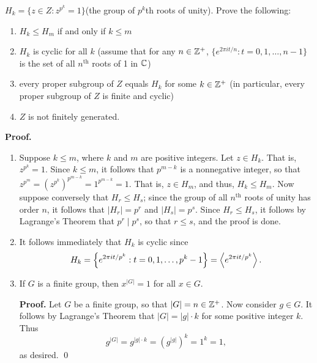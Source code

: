 \begin{enumerate}
                  $H_k = \{z \in Z : z^{p^k} = 1\}$(the group of $p^k$th roots
                  of unity). Prove the following:
                  \begin{enumerate}
                     \item $H_k \le H_m$ if and only if $k \le m$
                     \item $H_k$ is cyclic for all $k$ (assume that for any
                           $n \in \mathbb{Z}^+$, $\{e^{2\pi it/n}:t =0,1,\ldots, n-1\}$
                           is the set of all $n^{\text{th}}$ roots of 1 in
                           $\mathbb{C}$)
                     \item every proper subgroup of $Z$ equals $H_k$ for some
                           $k \in \mathbb{Z}^+$ (in particular, every proper subgroup of
                           $Z$ is finite and cyclic)
                     \item $Z$ is not finitely generated.
                  \end{enumerate}

      \textbf{Proof.}

      \begin{enumerate}
         \item Suppose $k \le m$, where $k$ and $m$ are positive integers. Let
               $z \in H_k$. That is, $z^{p^k} = 1$. Since $k \le m$, it follows
               that $p^{m-k}$ is a nonnegative integer, so that
               $z^{p^m} = (z^{p^k})^{p^{m-k}} = 1^{p^{m-k}} = 1$. That is,
               $z \in H_m$, and thus, $H_k \le H_m$. Now suppose conversely that
               $H_r \le H_s$; since the group of all $n^{\text{th}}$ roots of 
               unity has order $n$, it follows that $|H_r| = p^r$ and
               $|H_s| = p^s$. Since $H_r \le H_s$, it follows by Lagrange's 
               Theorem that $p^r \mid p^s$, so that $r \le s$, and the proof is 
               done.
         \item It follows immediately that $H_k$ is cyclic since
               $$
                  H_k = \left\{e^{2\pi it/p^k}: t = 0,1,\ldots,
                        p^k-1\right\} = \left\langle e^{2\pi it/p^k} \right\rangle.
               $$
         \item \begin{lemma} \label{2_4_18_1} If $G$ is a finite group, then
               $x^{|G|} = 1$ for all $x \in G$.
               \end{lemma}


               \textbf{Proof.} Let $G$ be a finite group, so that
               $|G| = n \in \mathbb{Z}^+$. Now consider $g \in G$. It follows by
               Lagrange's Theorem that $|G| = |g| \cdot k$ for some positive
               integer $k$. Thus
               $$g^{|G|} = g^{|g| \cdot k} = (g^{|g|})^k = 1^k = 1,$$
               as desired. \qed \\
         

\end{enumerate}
\end{enumerate}
